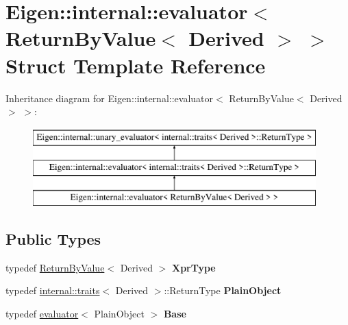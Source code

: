 \hypertarget{struct_eigen_1_1internal_1_1evaluator_3_01_return_by_value_3_01_derived_01_4_01_4}{}\section{Eigen\+::internal\+::evaluator$<$ Return\+By\+Value$<$ Derived $>$ $>$ Struct Template Reference}
\label{struct_eigen_1_1internal_1_1evaluator_3_01_return_by_value_3_01_derived_01_4_01_4}
Inheritance diagram for Eigen\+::internal\+::evaluator$<$ Return\+By\+Value$<$ Derived $>$ $>$\+:\begin{figure}[H]
\begin{center}
\leavevmode
\includegraphics[height=3.000000cm]{struct_eigen_1_1internal_1_1evaluator_3_01_return_by_value_3_01_derived_01_4_01_4}
\end{center}
\end{figure}
\subsection*{Public Types}
\begin{DoxyCompactItemize}
\item 
\mbox{\label{struct_eigen_1_1internal_1_1evaluator_3_01_return_by_value_3_01_derived_01_4_01_4_a45412c388bf32160dec93549d4245b3b}} 
typedef \mbox{\hyperlink{class_eigen_1_1_return_by_value}{Return\+By\+Value}}$<$ Derived $>$ {\bfseries Xpr\+Type}
\item 
\mbox{\label{struct_eigen_1_1internal_1_1evaluator_3_01_return_by_value_3_01_derived_01_4_01_4_ad401c194bc0d4bf1768aa039d54df83a}} 
typedef \mbox{\hyperlink{struct_eigen_1_1internal_1_1traits}{internal\+::traits}}$<$ Derived $>$\+::Return\+Type {\bfseries Plain\+Object}
\item 
\mbox{\label{struct_eigen_1_1internal_1_1evaluator_3_01_return_by_value_3_01_derived_01_4_01_4_a83b99ea3f0fa1030fa56750cb31bfc17}} 
typedef \mbox{\hyperlink{struct_eigen_1_1internal_1_1evaluator}{evaluator}}$<$ Plain\+Object $>$ {\bfseries Base}
\end{DoxyCompactItemize}
